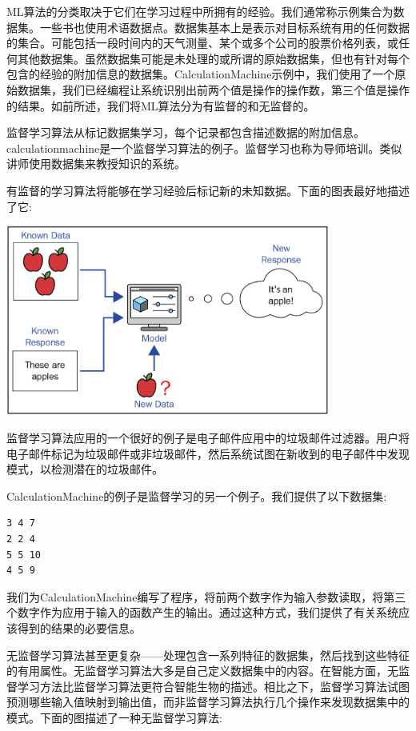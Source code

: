 ML算法的分类取决于它们在学习过程中所拥有的经验。我们通常称示例集合为数据集。一些书也使用术语数据点。数据集基本上是表示对目标系统有用的任何数据的集合。可能包括一段时间内的天气测量、某个或多个公司的股票价格列表，或任何其他数据集。虽然数据集可能是未处理的或所谓的原始数据集，但也有针对每个包含的经验的附加信息的数据集。CalculationMachine示例中，我们使用了一个原始数据集，我们已经编程让系统识别出前两个值是操作的操作数，第三个值是操作的结果。如前所述，我们将ML算法分为有监督的和无监督的。 \par
监督学习算法从标记数据集学习，每个记录都包含描述数据的附加信息。calculationmachine是一个监督学习算法的例子。监督学习也称为导师培训。类似讲师使用数据集来教授知识的系统。 \par
有监督的学习算法将能够在学习经验后标记新的未知数据。下面的图表最好地描述了它: \par

\begin{center}
	\includegraphics[width=0.8\textwidth]{content/Section-3/Chapter-15/7}
\end{center}

监督学习算法应用的一个很好的例子是电子邮件应用中的垃圾邮件过滤器。用户将电子邮件标记为垃圾邮件或非垃圾邮件，然后系统试图在新收到的电子邮件中发现模式，以检测潜在的垃圾邮件。 \par
CalculationMachine的例子是监督学习的另一个例子。我们提供了以下数据集: \par

\begin{lstlisting}[caption={}]
3 4 7
2 2 4
5 5 10
4 5 9
\end{lstlisting}

我们为CalculationMachine编写了程序，将前两个数字作为输入参数读取，将第三个数字作为应用于输入的函数产生的输出。通过这种方式，我们提供了有关系统应该得到的结果的必要信息。 \par
无监督学习算法甚至更复杂——处理包含一系列特征的数据集，然后找到这些特征的有用属性。无监督学习算法大多是自己定义数据集中的内容。在智能方面，无监督学习方法比监督学习算法更符合智能生物的描述。相比之下，监督学习算法试图预测哪些输入值映射到输出值，而非监督学习算法执行几个操作来发现数据集中的模式。下面的图描述了一种无监督学习算法: \par

